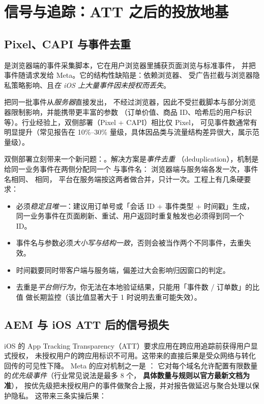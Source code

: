 \section{信号与追踪：ATT 之后的投放地基}
\label{sec:meta-signal}

\subsection{Pixel、CAPI 与事件去重}

是浏览器端的事件采集脚本，它在用户浏览器里捕获页面浏览与标准事件，
并把事件随请求发给 Meta。它的结构性缺陷是：依赖浏览器、
受广告拦截与浏览器隐私策略影响、且\emph{在 iOS 上大量事件因未授权而丢失}。

把同一批事件从\emph{服务器}直接发出，
不经过浏览器，因此不受拦截脚本与部分浏览器限制影响，并能携带更丰富的参数
（订单价值、商品 ID、哈希后的用户标识等）。行业经验上，双侧部署（Pixel + CAPI）相比仅 Pixel，
可见事件数通常有明显提升（常见报告在 10\%--30\% 量级，具体因品类与流量结构差异很大，属示范量级）。

双侧部署立刻带来一个新问题：。解决方案是\emph{事件去重}
（deduplication），机制是给同一业务事件在两侧分配同一个  与事件名：
浏览器端与服务端各发一次，事件名相同、 相同，
平台在服务端按这两者做合并，只计一次。工程上有几条硬要求：

\begin{itemize}
  \item {} 必须\emph{稳定且唯一}：建议用订单号或「会话 ID + 事件类型 + 时间戳」生成，
        同一业务事件在页面刷新、重试、用户返回时重复触发也必须得到同一个 ID。
  \item 事件名与参数必须\emph{大小写与结构一致}，否则会被当作两个不同事件，去重失效。
  \item 时间戳要同时带客户端与服务端，偏差过大会影响归因窗口的判定。
  \item 去重是\emph{平台侧行为}，你无法在本地验证结果，只能用「事件数 / 订单数」的比值
        做长期监控（该比值显著大于 1 时说明去重可能失效）。
\end{itemize}

\subsection{AEM 与 iOS ATT 后的信号损失}

iOS 的 App Tracking Transparency（ATT）要求应用在跨应用追踪前获得用户显式授权，
未授权用户的跨应用标识不可用。这带来的直接后果是受众网络与转化回传的可见性下降。
Meta 的应对机制之一是 ：
它对每个域名允许配置有限数量的\emph{优先级事件}（行业常见说法是最多 8 个，
\textbf{具体数量与规则以官方最新文档为准}），
按优先级把未授权用户的事件做聚合上报，并对报告做延迟与聚合处理以保护隐私。
这带来三条实操后果：

